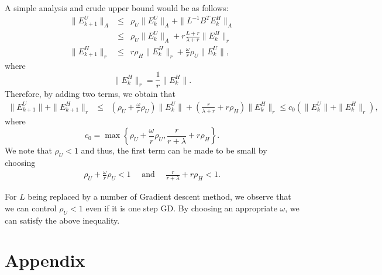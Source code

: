 \begin{itemize}
A simple analysis and crude upper bound would be as follows: 
\begin{eqnarray*}
\|E_{k+1}^U\|_{A} &\leq& \rho_U \|E_k^U\|_{A} + \|L^{-1} B^T E_k^H\|_{A} \\ 
&\leq&  \rho_U \|E_k^U\|_{A} + r \frac{L + r}{\lambda + r} \|E_k^H\|_r \\
\|E_{k+1}^H\|_r &\leq& r \rho_H \|E_k^H\|_r + \frac{\omega}{r} \rho_U \|E_k^U\|,  
\end{eqnarray*}
where 
\begin{equation}
\|E_k^H\|_r = \frac{1}{r}\|E_k^H\|.   
\end{equation}
Therefore, by adding two terms, we obtain that 
\begin{eqnarray*}
\|E_{k+1}^U\| + \|E_{k+1}^H\|_r &\leq& \left ( \rho_U + \frac{\omega}{r} \rho_U \right) \|E_k^U\| + \left ( \frac{r}{\lambda + r} + r \rho_H \right ) \|E_k^H\|_r \leq c_0 \left ( \|E_{k}^U\| + \|E_{k}^H\|_r \right ),  
\end{eqnarray*}
where 
\begin{equation}
c_0 = \max \left \{ \rho_U + \frac{\omega}{r} \rho_U, \frac{r}{r+\lambda} + r\rho_H \right \}. 
\end{equation} 
We note that $\rho_U < 1$ and thus, the first term can be made to be small by choosing 
\begin{eqnarray}
\rho_U + \frac{\omega}{r} \rho_U < 1 \quad \mbox{ and } \quad \frac{r}{r+\lambda} + r\rho_H < 1. 
\end{eqnarray}
\begin{remark}
For $L$ being replaced by a number of Gradient descent method, we observe that we can control $\rho_U < 1$ even if it is one step GD. By choosing an appropriate $\omega$, we can satisfy the above inequality. 
\end{remark}

% 

\section{Appendix} 


\end{itemize}
